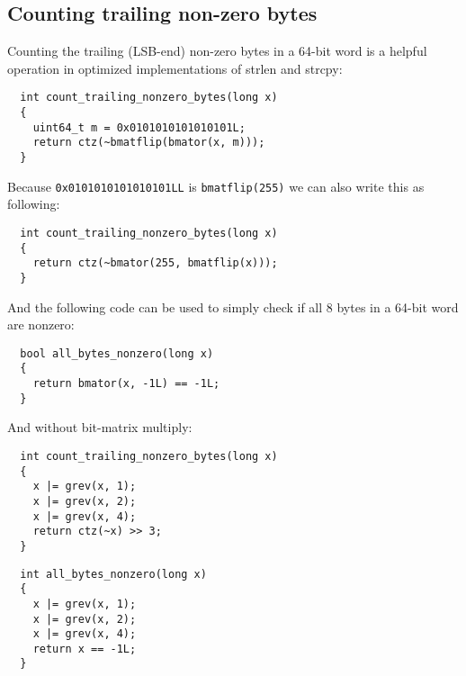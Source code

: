 
\subsection{Counting trailing non-zero bytes}

Counting the trailing (LSB-end) non-zero bytes in a 64-bit word
is a helpful operation in optimized implementations of strlen
and strcpy:

\begin{minipage}{\linewidth}
\begin{verbatim}
  int count_trailing_nonzero_bytes(long x)
  {
    uint64_t m = 0x0101010101010101L;
    return ctz(~bmatflip(bmator(x, m)));
  }
\end{verbatim}
\end{minipage}

Because {\tt 0x0101010101010101LL} is {\tt bmatflip(255)} we can also write
this as following:

\begin{minipage}{\linewidth}
\begin{verbatim}
  int count_trailing_nonzero_bytes(long x)
  {
    return ctz(~bmator(255, bmatflip(x)));
  }
\end{verbatim}
\end{minipage}

And the following code can be used to simply check if all 8 bytes in a 64-bit word
are nonzero:

\begin{minipage}{\linewidth}
\begin{verbatim}
  bool all_bytes_nonzero(long x)
  {
    return bmator(x, -1L) == -1L;
  }
\end{verbatim}
\end{minipage}

And without bit-matrix multiply:

\begin{minipage}{\linewidth}
\begin{verbatim}
  int count_trailing_nonzero_bytes(long x)
  {
    x |= grev(x, 1);
    x |= grev(x, 2);
    x |= grev(x, 4);
    return ctz(~x) >> 3;
  }
\end{verbatim}
\end{minipage}

\begin{minipage}{\linewidth}
\begin{verbatim}
  int all_bytes_nonzero(long x)
  {
    x |= grev(x, 1);
    x |= grev(x, 2);
    x |= grev(x, 4);
    return x == -1L;
  }
\end{verbatim}
\end{minipage}

